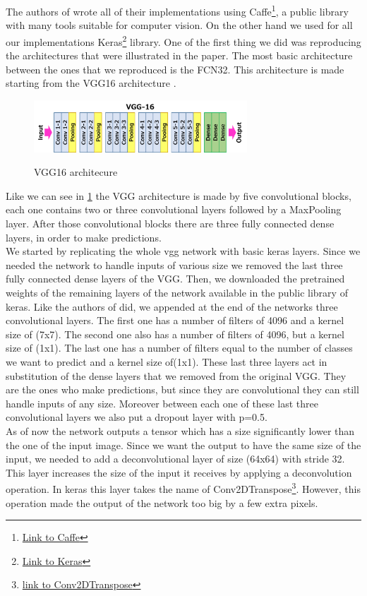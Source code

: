 \documentclass[10pt,twocolumn,letterpaper]{article}
\begin{document}
The authors of \cite{projectPaper} wrote all of their implementations using Caffe\footnote{\href{https://caffe.berkeleyvision.org/}{Link to Caffe}}, a public library with many tools suitable for computer vision. On the other hand we used for all our implementations Keras\footnote{\href{https://keras.io/}{Link to Keras}} library.
One of the first thing we did was reproducing the architectures that were illustrated in the paper. The most basic architecture between the ones that we reproduced is the FCN32. This architecture is made starting from the VGG16 architecture \cite{weights}.
\begin{figure}[t]
	\includegraphics[width=8cm]{image/vgg16}
	\label{vgg}
	\centering
	\caption{VGG16 architecure}
\end{figure}
Like we can see in \ref{vgg} the VGG architecture is made by five convolutional blocks, each one contains two or three convolutional layers followed by a MaxPooling layer. After those convolutional blocks there are three fully connected dense layers, in order to make predictions. \\
We started by replicating the whole vgg network with basic keras layers. Since we needed the network to handle inputs of various size we removed the last three fully connected dense layers of the VGG. Then, we downloaded the pretrained weights of the remaining layers of the network available in the public library of keras.
Like the authors of \cite{projectPaper} did, we appended at the end of the networks three convolutional layers. The first one has a number of filters of 4096 and a kernel size of (7x7). The second one also has a number of filters of 4096, but a kernel size of (1x1). The last one has a number of filters equal to the number of classes we want to predict and a kernel size of(1x1).
These last three layers act in substitution of the dense layers that we removed from the original VGG. They are the ones who make predictions, but since they are convolutional they can still handle inputs of any size.
Moreover between each one of these last three convolutional layers we also put a dropout layer with p=0.5.\\
As of now the network outputs a tensor which has a size significantly lower than the one of the input image. Since we want the output to have the same size of the input, we needed to add a deconvolutional layer of size (64x64) with stride 32. This layer increases the size of the input it receives by applying a deconvolution operation. In keras this layer takes the name of Conv2DTranspose\footnote{\href{https://www.tensorflow.org/api_docs/python/tf/keras/layers/Conv2DTranspose}{link to Conv2DTranspose}}. However, this operation made the output of the network too big by a few extra pixels.\\
\end{document}
